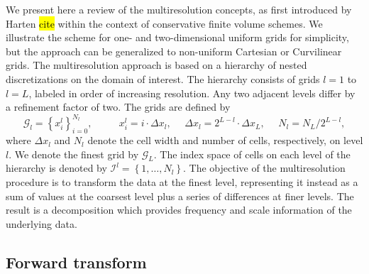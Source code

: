 \documentclass[]{article}
\begin{document}
    We present here a review of the multiresolution concepts, as first
    introduced by Harten \hl{cite} within the context of conservative finite volume
    schemes. We illustrate the scheme for one- and two-dimensional uniform
    grids for simplicity, but the approach can be generalized to non-uniform
    Cartesian or Curvilinear grids. The multiresolution approach is based on a
    hierarchy of nested discretizations on the domain of interest.  The
    hierarchy consists of grids $l=1$ to $l=L$, labeled in order of increasing
    resolution. Any two adjacent levels differ by a refinement factor of two.
    The grids are defined by
    \begin{equation}
        \bm{\mathcal{G}}_{l} = \left\{ x_{i}^{l} \right\}_{i=0}^{N_{l}}, \text{ }
        \text{ } \text{ } \text{ } x_{i}^{l} = i \cdot \Delta x_{l}, \text{ }
        \text{ } \Delta x_{l} = 2^{L-l} \cdot \Delta x_{L}, \text{ } \text{ } N_{l} = N_{L}
        / 2^{L-l},
    \end{equation}
    where $\Delta x_{l}$ and $N_{l}$ denote the cell width and number of cells,
    respectively, on level $l$. We denote the finest grid by
    $\bm{\mathcal{G}}_{L}$. The index space of cells on each level of the
    hierarchy is denoted by $\bm{\mathcal{I}}^{l} = \left\{ 1,\dots,N_{l}
    \right\}$. The objective of the multiresolution procedure is to transform
    the data at the finest level, representing it instead as a sum of values at
    the coarsest level plus a series of differences at finer levels. The result
    is a decomposition which provides frequency and scale information of the
    underlying data.

    \subsection*{Forward transform}
\end{document}
